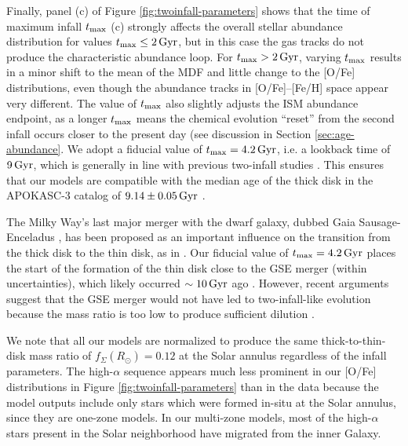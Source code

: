 \documentclass[twocolumn,twocolappendix,linenumbers]{aastex631}
\newcommand{\Gyr}{\,{\rm Gyr}}
\begin{document}
Finally, panel (c) of Figure \ref{fig:twoinfall-parameters} shows that the time of maximum infall $t_{\rm max}$ (c) strongly affects the overall stellar abundance distribution for values $t_{\rm max}\leq2\Gyr$, but in this case the gas tracks do not produce the characteristic abundance loop. For $t_{\rm max}>2\Gyr$, varying $t_{\rm max}$ results in a minor shift to the mean of the MDF and little change to the [O/Fe] distributions, even though the abundance tracks in [O/Fe]--[Fe/H] space appear very different. The value of $t_{\rm max}$ also slightly adjusts the ISM abundance endpoint, as a longer $t_{\rm max}$ means the chemical evolution ``reset'' from the second infall occurs closer to the present day (see discussion in Section \ref{sec:age-abundance}. We adopt a fiducial value of $t_{\rm max}=4.2\Gyr$, i.e. a lookback time of $9\Gyr$, which is generally in line with previous two-infall studies \citep[e.g.,][]{nissen_high-precision_2020,spitoni_galactic_2020,spitoni_apogee_2021}. This ensures that our models are compatible with the median age of the thick disk in the APOKASC-3 catalog of $9.14\pm0.05\Gyr$ \citep{pinsonneault_apokasc-3_2025}. 

The Milky Way's last major merger with the dwarf galaxy, dubbed Gaia Sausage-Enceladus \citep[GSE;][]{belokurov_co-formation_2018,helmi_merger_2018}, has been proposed as an important influence on the transition from the thick disk to the thin disk, as in \citet{spitoni_remind_2024}. Our fiducial value of $t_{\rm max}=4.2\Gyr$ places the start of the formation of the thin disk close to the GSE merger (within uncertainties), which likely occurred $\sim10\Gyr$ ago \citep[e.g.,][]{helmi_merger_2018,gallart_uncovering_2019,naidu_reconstructing_2021,woody_rapid_2025}. However, recent arguments suggest that the GSE merger would not have led to two-infall-like evolution because the mass ratio is too low to produce sufficient dilution \citep{orkney_milky_2025}.

We note that all our models are normalized to produce the same thick-to-thin-disk mass ratio of $f_{\Sigma}(R_\odot)=0.12$ \citep{bland-hawthorn_galaxy_2016} at the Solar annulus regardless of the infall parameters. The high-$\alpha$ sequence appears much less prominent in our [O/Fe] distributions in Figure \ref{fig:twoinfall-parameters} than in the data because the model outputs include only stars which were formed in-situ at the Solar annulus, since they are one-zone models. In our multi-zone models, most of the high-$\alpha$ stars present in the Solar neighborhood have migrated from the inner Galaxy.
\end{document}
